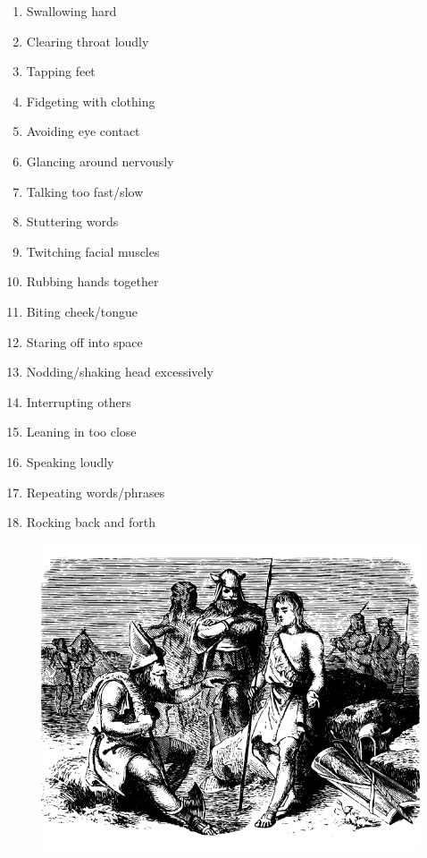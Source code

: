 \documentclass[12pt]{book}  %
\begin{document}
\begin{multicols}{2}
\begin{enumerate}
        \item Swallowing hard
        \item Clearing throat loudly
        \item Tapping feet
        \item Fidgeting with clothing
        \item Avoiding eye contact
        \item Glancing around nervously
        \item Talking too fast/slow
        \item Stuttering words
        \item Twitching facial muscles
        \item Rubbing hands together
        \item Biting cheek/tongue
        \item Staring off into space
        \item Nodding/shaking head excessively
        \item Interrupting others
        \item Leaning in too close
        \item Speaking loudly
        \item Repeating words/phrases
        \item Rocking back and forth
    \end{enumerate}
    \end{multicols}
    
\begin{figure}[h]
    \centering
    \includegraphics[width=\textwidth]{./images/personality06.pdf}
\end{figure}
\end{document}
